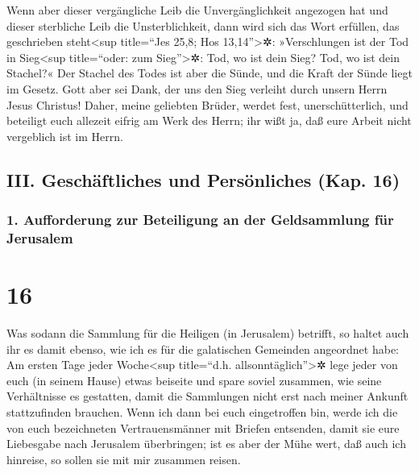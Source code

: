  Wenn aber dieser vergängliche Leib die Unvergänglichkeit
angezogen hat und dieser sterbliche Leib die Unsterblichkeit, dann wird
sich das Wort erfüllen, das geschrieben steht\textless sup title=``Jes
25,8; Hos 13,14''\textgreater✲: »Verschlungen ist der Tod in
Sieg\textless sup title=``oder: zum Sieg''\textgreater✲: 
Tod, wo ist dein Sieg?  Tod, wo ist dein Stachel?« Der
Stachel des Todes ist aber die Sünde, und die Kraft der Sünde liegt im
Gesetz.  Gott aber sei Dank, der uns den Sieg verleiht
durch unsern Herrn Jesus Christus!  Daher, meine
geliebten Brüder, werdet fest, unerschütterlich, und beteiligt euch
allezeit eifrig am Werk des Herrn; ihr wißt ja, daß eure Arbeit nicht
vergeblich ist im Herrn.

\hypertarget{iii.-geschuxe4ftliches-und-persuxf6nliches-kap.-16}{%
\subsection{III. Geschäftliches und Persönliches (Kap.
16)}\label{iii.-geschuxe4ftliches-und-persuxf6nliches-kap.-16}}

\hypertarget{aufforderung-zur-beteiligung-an-der-geldsammlung-fuxfcr-jerusalem}{%
\subsubsection{1. Aufforderung zur Beteiligung an der Geldsammlung für
Jerusalem}\label{aufforderung-zur-beteiligung-an-der-geldsammlung-fuxfcr-jerusalem}}

\hypertarget{section-15}{%
\section{16}\label{section-15}}

 Was sodann die Sammlung für die Heiligen (in Jerusalem)
betrifft, so haltet auch ihr es damit ebenso, wie ich es für die
galatischen Gemeinden angeordnet habe:  Am ersten Tage
jeder Woche\textless sup title=``d.h. allsonntäglich''\textgreater✲ lege
jeder von euch (in seinem Hause) etwas beiseite und spare soviel
zusammen, wie seine Verhältnisse es gestatten, damit die Sammlungen
nicht erst nach meiner Ankunft stattzufinden brauchen. 
Wenn ich dann bei euch eingetroffen bin, werde ich die von euch
bezeichneten Vertrauensmänner mit Briefen entsenden, damit sie eure
Liebesgabe nach Jerusalem überbringen;  ist es aber der
Mühe wert, daß auch ich hinreise, so sollen sie mit mir zusammen reisen.

